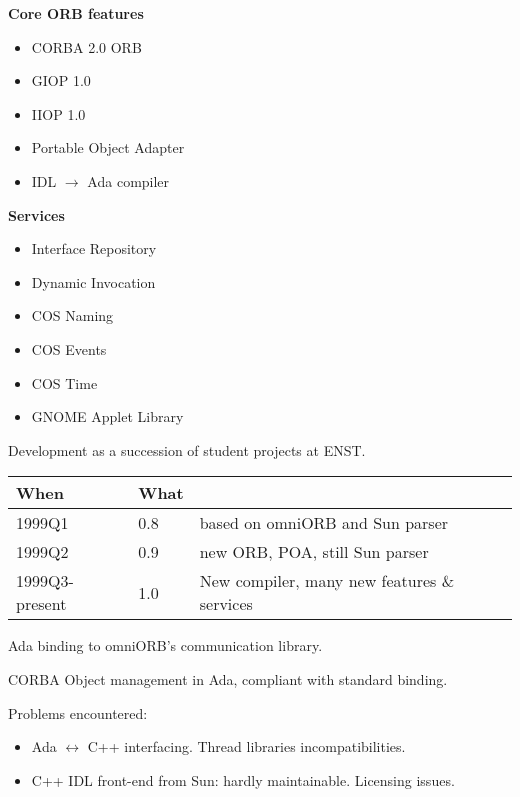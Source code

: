 \documentclass[a4,slidesec]{seminar}
\newcommand{\ab}{AdaBroker}
\begin{document}
\begin{slide}
\slidesubheading{\ab{} features}

\hfill
\parbox[t]{0.45\textwidth}{%
\begin{center}
\textbf{Core ORB features}
\end{center}

\begin{itemize}
\item CORBA 2.0 ORB
\item GIOP 1.0
\item IIOP 1.0
\item Portable Object Adapter
\item IDL $\rightarrow$ Ada compiler
\end{itemize}
}%
\hfill%
\parbox[t]{0.45\textwidth}{%
\begin{center}
\textbf{Services}
\end{center}
\begin{itemize}
\item Interface Repository
\item Dynamic Invocation
\item COS Naming
\item COS Events
\item COS Time
\item GNOME Applet Library
\end{itemize}
}

\end{slide}

\begin{slide}

Development as a succession of student projects at ENST.

\begin{tabular}{l|ll}
\textbf{When} & \textbf{What} & \\ \hline
1999Q1 & 0.8 & based on omniORB and Sun parser \\
1999Q2 &  0.9 & new ORB, POA, still Sun parser \\
1999Q3-present & 1.0 & New compiler, many new features \& services
\end{tabular}

\end{slide}

\begin{slide}


Ada binding to omniORB's communication library.

CORBA Object management in Ada, compliant with standard
binding.

Problems encountered:
\begin{itemize}
\item Ada $\longleftrightarrow$ C++ interfacing.
  Thread libraries incompatibilities.
\item C++ IDL front-end from Sun: hardly maintainable.
  Licensing issues.
\end{itemize}

\end{slide}
\end{document}
